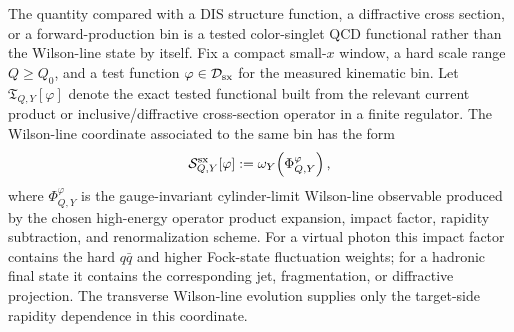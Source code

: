 \begin{remark}
\label{rem:qcd-small-x-measured-observable-interface}
The quantity compared with a DIS structure function, a diffractive cross
section, or a forward-production bin is a tested color-singlet QCD functional
rather than the Wilson-line state by itself.  Fix a compact small-\(x\)
window, a hard scale range \(Q\ge Q_0\), and a test function
\(\varphi\in\mathcal D_{\rm sx}\) for the measured kinematic bin.  Let
\(\mathfrak T_{Q,Y}[\varphi]\) denote the exact tested functional built from
the relevant current product or inclusive/diffractive cross-section operator
in a finite regulator.  The Wilson-line coordinate associated to the same bin
has the form
\begin{equation}
  \mathcal S^{\rm sx}_{Q,Y}[\varphi]
  :=
  \omega_Y\!\left(\Phi^\varphi_{Q,Y}\right),
  \label{eq:qcd-small-x-wilson-line-observable-coordinate}
\end{equation}
where \(\Phi^\varphi_{Q,Y}\) is the gauge-invariant cylinder-limit Wilson-line
observable produced by the chosen high-energy operator product expansion,
impact factor, rapidity subtraction, and renormalization scheme.  For a
virtual photon this impact factor contains the hard \(q\bar q\) and higher
Fock-state fluctuation weights; for a hadronic final state it contains the
corresponding jet, fragmentation, or diffractive projection.  The transverse
Wilson-line evolution supplies only the target-side rapidity dependence in
this coordinate.


\end{remark}
